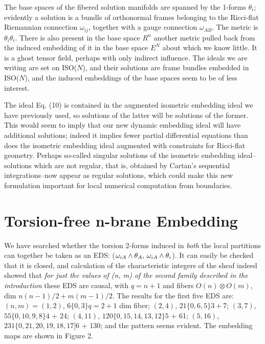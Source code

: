 \documentclass[a4paper,a4paper]{article}
\begin{document}
 The base spaces of the fibered solution manifolds are spanned by the
1-forms ${{\theta }_i}$; evidently a solution is a bundle of orthonormal
frames belonging to the Ricci-flat Riemannian connection ${{\omega }_{{ij}}}$, together with
a gauge connection ${{\omega }_{{AB}}}$.  The metric is ${{\theta
}_i}{{\theta }_i}$. There is also present in the base space ${R^n}$ 
another metric pulled back from the induced embedding
of it in the base space ${E^N}$ about which we know little.   It
is a ghost tensor field,  perhaps with only indirect influence.  The
ideals we are writing are set on ISO($N$),  and their solutions are frame
bundles embedded in ISO($N$),  and the induced embeddings of the base
spaces seem to be of less interest.

         The ideal Eq. (10) is contained in the augmented isometric
embedding ideal we have previously used,  so solutions of the latter
will be solutions of the former.  This would seem to imply that our new dynamic embedding
ideal will have additional solutions; indeed it implies fewer partial
differential equations than does the isometric embedding ideal augmented with
constraints for Ricci-flat geometry.  Perhaps so-called singular
solutions of the isometric embedding ideal--solutions which are not regular,  that is,
obtained by Cartan's sequential integrations--now appear as regular
solutions, which could make this new formulation important for local numerical
computation from boundaries.


\section{Torsion-free  n-brane Embedding}

 We have searched whether the torsion 2-forms induced in {\itshape both}
the local partitions can together be taken as an EDS:
(${{\omega }_{{iA}}}\wedge
{{\theta }_A}\),  \({{\omega }_{{iA}}}\wedge {{\theta }_i}$).
It can easily be checked that it is closed,  and calculation
of the characteristic integers of the sheaf indeed showed that
{\itshape for just the values of (n, m) of the second family described in the
introduction} these EDS are  causal,  with $q = n + 1$ and fibers $O(n) \otimes
O(m)$, dim $n(n-1)/2 + m(m-1)/2$.  The results for the first five EDS
are:
$(n, m) = (1, 2)$,  $6\{0, 3\} q = 2 + 1$ dim fiber; $(2, 4)$, $21\{0, 6, 5\}
3 + 7$; $(3, 7)$, $55\{0, 10, 9, 8\}4$ + 24;  $(4, 11)$, $120\{0, 15, 14, 13,
12\} 5$ + 61;  $(5, 16)$, $231\{0, 21, 20, 19, 18, 17]6$ + 130; and the pattern
seems evident.  The embedding maps are shown in Figure 2.
\end{document}
